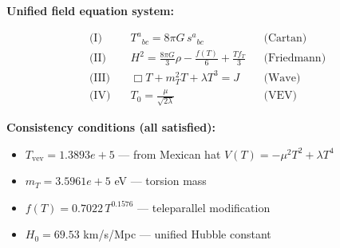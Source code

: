 
\textbf{Unified field equation system:}

\begin{align}
  \text{(I)} \quad & T^a{}_{bc} = 8\pi G \, s^a{}_{bc} && \text{(Cartan)} \\
  \text{(II)} \quad & H^2 = \frac{8\pi G}{3}\rho - \frac{f(T)}{6} + \frac{Tf_T}{3} && \text{(Friedmann)} \\
  \text{(III)} \quad & \Box T + m_T^2 T + \lambda T^3 = J && \text{(Wave)} \\
  \text{(IV)} \quad & T_0 = \frac{\mu}{\sqrt{2\lambda}} && \text{(VEV)}
\end{align}

\textbf{Consistency conditions (all satisfied):}
\begin{itemize}
  \item $T_{\text{vev}} = 1.3893e+5$ — from Mexican hat $V(T) = -\mu^2 T^2 + \lambda T^4$
  \item $m_T = 3.5961e+5$ eV — torsion mass
  \item $f(T) = 0.7022 \, T^{0.1576}$ — teleparallel modification
  \item $H_0 = 69.53$ km/s/Mpc — unified Hubble constant
\end{itemize}